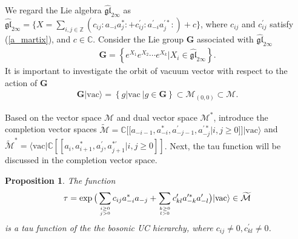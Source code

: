 \documentclass[11pt,reqno]{amsart}
\numberwithin{equation}{section}
\newtheorem{proposition}[theorem]{Proposition}
\begin{document}
We regard the Lie algebra $\mathfrak{\widehat{gl}}_{2\infty}$ as $\mathfrak{\widehat{gl}}_{2\infty}=\big\{X=\sum\limits_{i,j\in\mathbb{Z}}(
c_{ij}:a_{-i}a^{\ast}_{j}:+c^{\prime}_{ij}:a^{\prime}_{-i}a^{\prime\ast}_{j}:)
+c\big\}$, where $c_{ij}$ and $c^{\prime}_{ij}$ satisfy (\ref{a_martix}), and $c\in\mathbb{C}$. Consider the Lie group $\mathbf{G}$ associated with $\mathfrak{\widehat{gl}}_{2\infty}$
\begin{eqnarray}
\mathbf{G}=\left\{e^{X_{1}}e^{X_{2}}\cdots e^{X_{k}}|X_{i}\in\mathfrak{\widehat{gl}}_{2\infty}\right\}.
\end{eqnarray}
It is important to investigate the orbit of vacuum vector with respect to the action of  $\mathbf{G}$
\begin{eqnarray}
\mathbf{G}|\text{vac}\rangle=\left\{g|\text{vac}\ | g\in\mathbf{G} \right\}\subset \mathcal{M}_{(0,0)}\subset\mathcal{M}.
\end{eqnarray}

Based on the vector space $\mathcal{M}$ and dual vector space $\mathcal{M}^{\ast}$, introduce the completion vector spaces $\mathcal{\widetilde{M}}=\mathbb{C}[[a_{-i-1},a^{\ast}_{-i},a^{\prime}_{-j-1},
a^{\prime\ast}_{-j}|i,j\geq0]]|\text{vac}\rangle$ and $\mathcal{\widetilde{M}}^{\ast}=\langle\text{vac}|\mathbb{C}[[a_{i},a^{\ast}_{i+1},
a^{\prime}_{j},a^{\ast\prime}_{j+1}|i,j\geq0]]$. Next, the tau function will be discussed in  the completion vector space.






\begin{proposition}
The function
\begin{eqnarray}\label{tau_com}
\tau=\exp\big(\sum\limits_{i\geq0\atop{j>0}}c_{ij}a^{\ast}_{-i}a_{-j}+
\sum\limits_{k\geq0\atop{l>0}}c^{\prime}_{kl}a^{\prime\ast}_{-k}a^{\prime}_{-l}\big)
|\text{vac}\rangle \in \mathcal{\widetilde{M}}
\end{eqnarray}
is a tau function of the the bosonic UC hierarchy, where $c_{ij}\neq0, c^{\prime}_{kl}\neq0$.
\end{proposition}
\end{document}
